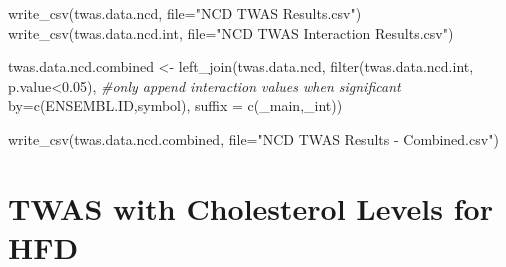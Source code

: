 \documentclass[
]{article}
\newenvironment{Shaded}{\begin{snugshade}}{\end{snugshade}}
\newcommand{\AttributeTok}[1]{\textcolor[rgb]{0.77,0.63,0.00}{#1}}
\newcommand{\CommentTok}[1]{\textcolor[rgb]{0.56,0.35,0.01}{\textit{#1}}}
\newcommand{\FloatTok}[1]{\textcolor[rgb]{0.00,0.00,0.81}{#1}}
\newcommand{\FunctionTok}[1]{\textcolor[rgb]{0.00,0.00,0.00}{#1}}
\newcommand{\NormalTok}[1]{#1}
\newcommand{\OtherTok}[1]{\textcolor[rgb]{0.56,0.35,0.01}{#1}}
\newcommand{\SpecialCharTok}[1]{\textcolor[rgb]{0.00,0.00,0.00}{#1}}
\newcommand{\StringTok}[1]{\textcolor[rgb]{0.31,0.60,0.02}{#1}}
\begin{document}
\begin{Shaded}
\begin{Highlighting}[]
\FunctionTok{write\_csv}\NormalTok{(twas.data.ncd,}
          \AttributeTok{file=}\StringTok{"NCD TWAS Results.csv"}\NormalTok{)}
\FunctionTok{write\_csv}\NormalTok{(twas.data.ncd.int,}
          \AttributeTok{file=}\StringTok{"NCD TWAS Interaction Results.csv"}\NormalTok{)}

\NormalTok{twas.data.ncd.combined }\OtherTok{\textless{}{-}} 
  \FunctionTok{left\_join}\NormalTok{(twas.data.ncd,}
            \FunctionTok{filter}\NormalTok{(twas.data.ncd.int, p.value}\SpecialCharTok{\textless{}}\FloatTok{0.05}\NormalTok{), }\CommentTok{\#only append interaction values when significant}
             \AttributeTok{by=}\FunctionTok{c}\NormalTok{(}\StringTok{\textquotesingle{}ENSEMBL.ID\textquotesingle{}}\NormalTok{,}\StringTok{\textquotesingle{}symbol\textquotesingle{}}\NormalTok{),}
             \AttributeTok{suffix =} \FunctionTok{c}\NormalTok{(}\StringTok{\textquotesingle{}\_main\textquotesingle{}}\NormalTok{,}\StringTok{\textquotesingle{}\_int\textquotesingle{}}\NormalTok{))}

\FunctionTok{write\_csv}\NormalTok{(twas.data.ncd.combined,}
          \AttributeTok{file=}\StringTok{"NCD TWAS Results {-} Combined.csv"}\NormalTok{)}
\end{Highlighting}
\end{Shaded}

\hypertarget{twas-with-cholesterol-levels-for-hfd}{%
\section{TWAS with Cholesterol Levels for
HFD}\label{twas-with-cholesterol-levels-for-hfd}}
\end{document}
